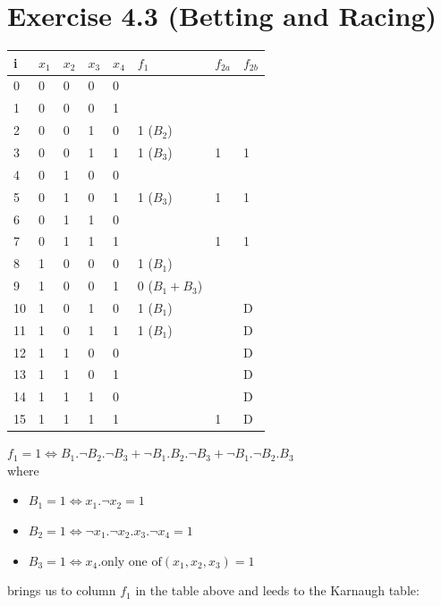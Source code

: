 \documentclass[10pt,a4paper]{scrartcl}
\newcommand{\subExercise}[1]{\vspace{0.5em} \noindent{\bf #1)}}
\begin{document}
\FloatBarrier
\section*{Exercise 4.3 (Betting and Racing)}

\begin{tabular}{|l||l|l|l|l||l||l|l|}\hline
i & $x_1$ & $x_2$ & $x_3$ & $x_4$ & $f_1$ & $f_{2a}$ & $f_{2b}$ \\\hline\hline
0 & 0 & 0 & 0 & 0 &                 &   &    \\\hline
1 & 0 & 0 & 0 & 1 &                 &   &    \\\hline
2 & 0 & 0 & 1 & 0 &    1 ($B_2$)    &   &    \\\hline
3 & 0 & 0 & 1 & 1 &    1 ($B_3$)    & 1 & 1  \\\hline
4 & 0 & 1 & 0 & 0 &                 &   &    \\\hline
5 & 0 & 1 & 0 & 1 &    1 ($B_3$)    & 1 & 1  \\\hline
6 & 0 & 1 & 1 & 0 &                 &   &    \\\hline
7 & 0 & 1 & 1 & 1 &                 & 1 & 1  \\\hline
8 & 1 & 0 & 0 & 0 &    1 ($B_1$)    &   &    \\\hline
9 & 1 & 0 & 0 & 1 &    0 ($B_1+B_3$)&   &    \\\hline
10 & 1 & 0 & 1 & 0 &   1 ($B_1$)    &   & D  \\\hline
11 & 1 & 0 & 1 & 1 &   1 ($B_1$)    &   & D  \\\hline
12 & 1 & 1 & 0 & 0 &                &   & D  \\\hline
13 & 1 & 1 & 0 & 1 &                &   & D  \\\hline
14 & 1 & 1 & 1 & 0 &                &   & D  \\\hline
15 & 1 & 1 & 1 & 1 &                & 1 & D  \\\hline
\end{tabular}

\subExercise{a1}
$f_1 = 1 \Leftrightarrow B_1 . \neg B_2 . \neg B_3 + \neg B_1 . B_2 . \neg B_3 + \neg B_1 . \neg B_2 . B_3$ \\ where
\begin{itemize}
 \item $B_1 = 1 \Leftrightarrow x_1 . \neg x_2 = 1$ 
 \item $B_2 = 1 \Leftrightarrow \neg x_1 . \neg x_2 . x_3 . \neg x_4  = 1$
 \item $B_3 = 1 \Leftrightarrow x_4 . \text{only one of}(x_1,x_2,x_3) = 1$
\end{itemize}
brings us to column $f_1$ in the table above and leeds to the Karnaugh table:
\end{document}
